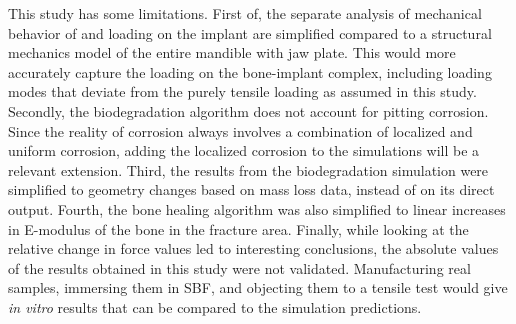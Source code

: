 This study has some limitations. First of, the separate analysis of mechanical behavior of and loading on the implant are simplified compared to a structural mechanics model of the entire mandible with jaw plate. This would more accurately capture the loading on the bone-implant complex, including loading modes that deviate from the purely tensile loading as assumed in this study. Secondly, the biodegradation algorithm does not account for pitting corrosion. Since the reality of corrosion always involves a combination of localized and uniform corrosion, adding the localized corrosion to the simulations will be a relevant extension. Third, the results from the biodegradation simulation were simplified to geometry changes based on mass loss data, instead of on its direct output. Fourth, the bone healing algorithm was also simplified to linear increases in E-modulus of the bone in the fracture area. Finally, while looking at the relative change in force values led to interesting conclusions, the absolute values of the results obtained in this study were not validated. Manufacturing real samples, immersing them in \gls{SBF}, and objecting them to a tensile test would give \textit{in vitro} results that can be compared to the simulation predictions.

